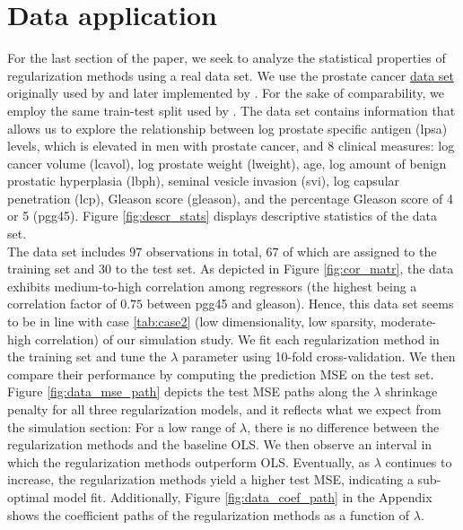 \section{Data application}
\label{section:data}

For the last section of the paper, we seek to analyze the statistical properties of regularization methods using a real data set. We use the prostate cancer \href{https://hastie.su.domains/ElemStatLearn/datasets/prostate.data}{data set} originally used by \cite{stamey1989prostate} and later implemented by \cite{zou2005regularization}. For the sake of comparability, we employ the same train-test split used by \cite{zou2005regularization}. The data set contains information that allows us to explore the relationship between log prostate specific antigen (lpsa) levels, which is
elevated in men with prostate cancer, and 8 clinical measures: log cancer volume (lcavol), log prostate weight (lweight), age, log amount of benign prostatic hyperplasia (lbph), seminal vesicle invasion (svi), log capsular penetration (lcp), Gleason score (gleason), and the percentage Gleason score of 4
or 5 (pgg45). Figure \ref{fig:descr_stats} displays descriptive statistics of the data set. \\

\noindent The data set includes $97$ observations in total, $67$ of which are assigned to the training set and $30$ to the test set. As depicted in Figure \ref{fig:cor_matr}, the data exhibits medium-to-high correlation among regressors (the highest being a correlation factor of $0.75$ between pgg45 and gleason). Hence, this data set seems to be in line with case \ref{tab:case2} (low dimensionality, low sparsity, moderate-high correlation) of our simulation study. We fit each regularization method in the training set and tune the $\lambda$ parameter using 10-fold cross-validation. We then compare their performance by computing the prediction MSE on the test set. \\

\noindent Figure \ref{fig:data_mse_path} depicts the test MSE paths along the $\lambda$ shrinkage penalty for all three regularization models, and it reflects what we expect from the simulation section: For a low range of $\lambda$, there is no difference between the regularization methods and the baseline OLS. We then observe an interval in which the regularization methods outperform OLS. Eventually, as $\lambda$ continues to increase, the regularization methods yield a higher test MSE, indicating a sub-optimal model fit. Additionally, Figure \ref{fig:data_coef_path} in the Appendix shows the coefficient paths of the regularization methods as a function of $\lambda$. \\

